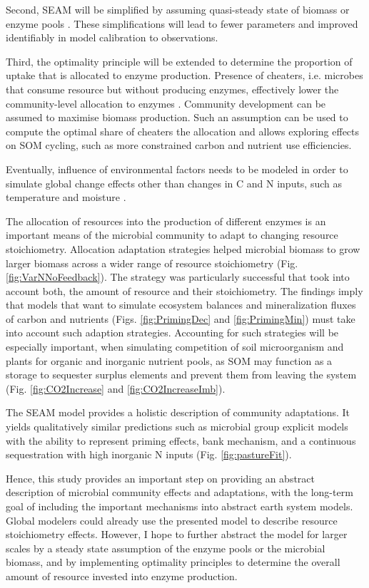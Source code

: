 Second, SEAM will be simplified by assuming quasi-steady state of biomass or
enzyme pools \citep{Wutzler13}. These simplifications will lead to fewer
parameters and improved identifiably in model calibration to observations.

Third, the optimality principle will be extended to determine the
proportion of uptake that is allocated to enzyme production. Presence of cheaters,
i.e. microbes that consume resource but without producing enzymes, effectively
lower the community-level allocation to enzymes \citep{Kaiser14}. Community
development can be assumed to maximise biomass production. Such an assumption can be
used to compute the optimal share of cheaters the allocation and allows
exploring effects on SOM cycling, such as more constrained carbon and nutrient
use efficiencies.

Eventually, influence of environmental factors needs to be modeled in order to
simulate global change effects other than changes in C and N inputs, such as
temperature and moisture \citep{Davidson12}.
 

\conclusions  
 
The allocation of resources into the production of different enzymes is an
important means of the microbial community to adapt to changing resource
stoichiometry. Allocation adaptation strategies helped microbial biomass to grow
larger biomass across a wider range of resource stoichiometry (Fig.
\ref{fig:VarNNoFeedback}). The strategy was particularly successful that took
into account both, the amount of resource and their stoichiometry.
The findings imply that models that want to simulate ecosystem balances and
mineralization fluxes of carbon and nutrients (Figs. \ref{fig:PrimingDec} and
\ref{fig:PrimingMin}) must take into account such adaption strategies.
Accounting for such strategies will be especially important, when simulating
competition of soil microorganism and plants for organic and inorganic nutrient
pools, as SOM may function as a storage to sequester surplus elements and
prevent them from leaving the system (Fig. \ref{fig:CO2Increase} and
\ref{fig:CO2IncreaseImb}).


The SEAM model provides a holistic description of community adaptations. It
yields qualitatively similar predictions such as microbial group explicit models
with the ability to represent priming effects, bank mechanism, and
a continuous sequestration with high inorganic N inputs (Fig. \ref{fig:pastureFit}).

Hence, this study provides an important step on providing an abstract
description of microbial community effects and adaptations, with the long-term
goal of including the important mechanisms into abstract earth system models.
Global modelers could already use the presented model to describe resource
stoichiometry effects. However, I hope to further abstract the model for larger
scales by a steady state assumption of the enzyme pools or the microbial
biomass, and by implementing optimality principles to determine the
overall amount of resource invested into enzyme production.


